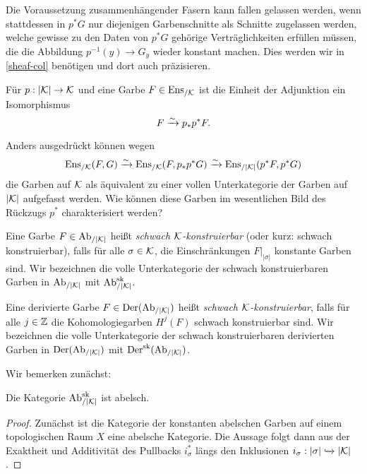 \begin{bem} \label{connected-fibers-subst}
  Die Voraussetzung zusammenhängender Fasern kann fallen gelassen
  werden, wenn stattdessen in $p^* G$ nur diejenigen Garbenschnitte
  als Schnitte zugelassen werden, welche gewisse zu den Daten von $p^*
  G$ gehörige Verträglichkeiten erfüllen müssen, die die Abbildung
  $p^{-1}(y) \to G_y$ wieder konstant machen. Dies werden wir in
  \ref{sheaf-col} benötigen und dort auch präzisieren.
\end{bem}
\begin{kor} \label{unit-iso}
  Für $p: |\mathcal{K}| \to \mathcal{K}$ und eine Garbe $F \in \operatorname{Ens}_{/\mathcal{K}}$ ist die
  Einheit der Adjunktion ein Isomorphismus
  \[ F \xrightarrow[]{\sim} p_* p^* F . \]
\end{kor}
Anders ausgedrückt können wegen
\[ \operatorname{Ens}_{/\mathcal{K}}(F, G) \xrightarrow[]{\sim} \operatorname{Ens}_{/\mathcal{K}}(F, p_* p^* G)
\xrightarrow[]{\sim} \operatorname{Ens}_{/|\mathcal{K}|}(p^* F, p^* G)
\]
die Garben auf $\mathcal{K}$ als äquivalent zu einer vollen Unterkategorie der
Garben auf $|\mathcal{K}|$ aufgefasst werden. Wie können diese Garben im
wesentlichen Bild des Rückzugs $p^*$ charakterisiert werden?
\begin{defn}
  Eine Garbe $F \in \operatorname{Ab}_{/|\mathcal{K}|}$ heißt \emph{schwach $\mathcal{K}$-konstruierbar}
  (oder kurz: schwach konstruierbar), falls für alle $\sigma \in \mathcal{K}$,
  die Einschränkungen $F|_{|\sigma|}$ konstante Garben sind. Wir
  bezeichnen die volle Unterkategorie der schwach konstruierbaren
  Garben in $\operatorname{Ab}_{/|\mathcal{K}|}$ mit $\operatorname{Ab}_{/|\mathcal{K}|}^{\operatorname{sk}}$.

  Eine derivierte Garbe $F \in \operatorname{Der}(\operatorname{Ab}_{/|\mathcal{K}|})$ heißt \emph{schwach
    $\mathcal{K}$-konstruierbar}, falls für alle $j \in \mathbb{Z}$ die
  Kohomologiegarben $H^j(F)$ schwach konstruierbar sind. Wir
  bezeichnen die volle Unterkategorie der schwach konstruierbaren
  derivierten Garben in $\operatorname{Der}(\operatorname{Ab}_{/|\mathcal{K}|})$ mit $\operatorname{Der}^{\operatorname{sk}}(\operatorname{Ab}_{/|\mathcal{K}|})$.
\end{defn}

Wir bemerken zunächst:
\begin{lemma}[\cite{KS}, 8.1.3] \label{skons-abelian}
  Die Kategorie $\operatorname{Ab}_{/|\mathcal{K}|}^{\operatorname{sk}}$ ist abelsch.
\end{lemma}
\begin{proof}
  Zunächst ist die Kategorie der konstanten abelschen Garben auf einem
  topologischen Raum $X$ eine abelsche Kategorie. Die Aussage folgt
  dann aus der Exaktheit und Additivität des Pullbacks $i_{\sigma}^*$
  längs den Inklusionen $i_{\sigma}: |\sigma| \xhookrightarrow{}
  |\mathcal{K}|$.
\end{proof}


